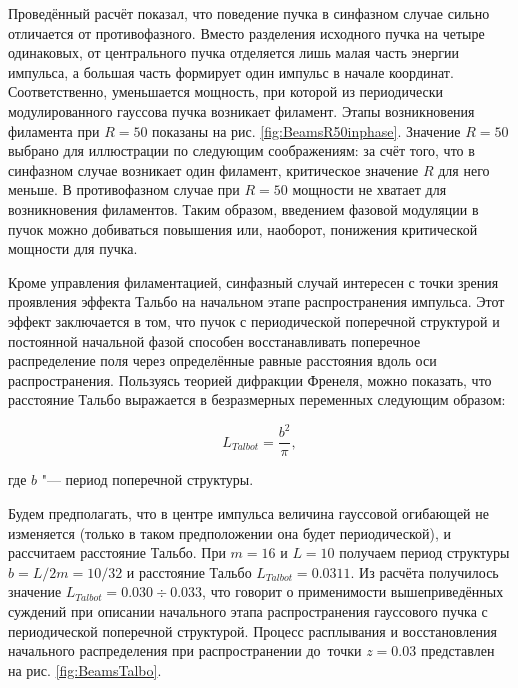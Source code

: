 Проведённый расчёт показал, что поведение пучка в синфазном случае сильно отличается от
противофазного. Вместо разделения исходного пучка на четыре одинаковых, от центрального пучка отделяется лишь малая
часть энергии импульса, а большая часть формирует один импульс в начале координат. Соответственно,
уменьшается мощность, при которой из периодически модулированного гауссова пучка
возникает филамент. Этапы возникновения филамента при $R = 50$ показаны на рис. \ref{fig:BeamsR50inphase}.
Значение $R = 50$ выбрано для иллюстрации по следующим соображениям: за счёт того, что
в синфазном случае возникает один филамент, критическое значение $R$ для него меньше.
В противофазном случае при $R = 50$ мощности не хватает для возникновения филаментов.
Таким образом, введением фазовой модуляции в пучок можно добиваться повышения или, наоборот,
понижения критической мощности для пучка.


Кроме управления филаментацией, синфазный случай интересен с точки зрения проявления
эффекта Тальбо \cite{KandidovKorolkov1998} на начальном этапе распространения импульса.
Этот эффект заключается в том, что пучок с периодической поперечной структурой и постоянной начальной фазой
способен восстанавливать поперечное распределение поля через определённые равные расстояния вдоль оси распространения.
Пользуясь теорией дифракции Френеля, можно показать, что расстояние Тальбо выражается в безразмерных переменных следующим образом:

\begin{equation}
L_{Talbot} = \frac{b^2}{\pi},
\end{equation}

где $b$ "--- период поперечной структуры.

Будем предполагать, что в центре импульса величина гауссовой огибающей не изменяется (только в таком предположении она будет периодической),
и рассчитаем расстояние Тальбо. При $m = 16$ и $L = 10$ получаем период структуры $b = L/2m = 10/32$
и расстояние Тальбо $L_{Talbot} = 0.0311$. Из расчёта получилось значение $L_{Talbot} = 0.030 \div 0.033$,
что говорит о применимости вышеприведённых суждений при описании начального этапа распространения гауссового пучка с периодической поперечной структурой.
Процесс расплывания и восстановления начального распределения при распространении до~точки $z = 0.03$ представлен на рис. \ref{fig:BeamsTalbo}.


